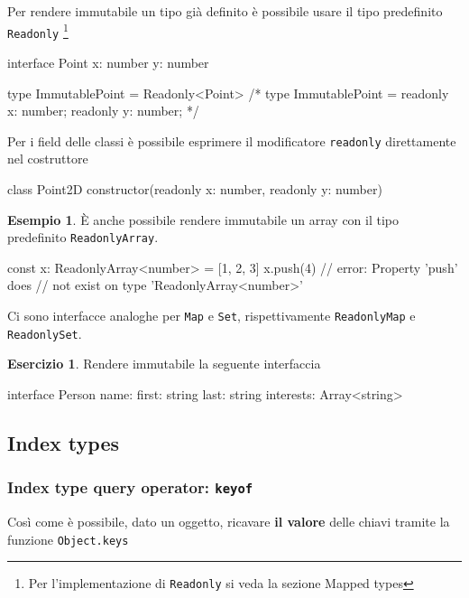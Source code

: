 \documentclass[12pt]{article}
\theoremstyle{definition}
\newtheorem{example}{Esempio}[subsection]
\newtheorem{exercise}{Esercizio}[subsection]
\newenvironment{code}
  {\vspace{0.5cm} \VerbatimEnvironment\begin{typescriptcode}}
  {\end{typescriptcode} \vspace{0.2cm}}
\begin{document}
Per rendere immutabile un tipo già definito è possibile usare il tipo predefinito \texttt{Readonly}
\footnote{Per l'implementazione di \texttt{Readonly} si veda la sezione Mapped types}

\begin{code}
interface Point {
  x: number
  y: number
}

type ImmutablePoint = Readonly<Point>
/*
type ImmutablePoint = {
    readonly x: number;
    readonly y: number;
}
*/
\end{code}

Per i field delle classi è possibile esprimere il modificatore \texttt{readonly} direttamente nel costruttore

\begin{code}
class Point2D {
  constructor(readonly x: number, readonly y: number) {}
}
\end{code}

\begin{example}
È anche possibile rendere immutabile un array con il tipo predefinito
\texttt{ReadonlyArray}.

\begin{code}
const x: ReadonlyArray<number> = [1, 2, 3]
x.push(4) // error: Property 'push' does
// not exist on type 'ReadonlyArray<number>'
\end{code}
\end{example}

Ci sono interfacce analoghe per \texttt{Map} e \texttt{Set}, rispettivamente \texttt{ReadonlyMap} e \texttt{ReadonlySet}.

\begin{exercise}
Rendere immutabile la seguente interfaccia

\begin{code}
interface Person {
  name: {
    first: string
    last: string
  }
  interests: Array<string>
}
\end{code}
\end{exercise}

\subsection{Index types}

\subsubsection{Index type query operator: \texttt{keyof}}

Così come è possibile, dato un oggetto, ricavare \textbf{il valore} delle chiavi tramite la funzione \texttt{Object.keys}
\end{document}
